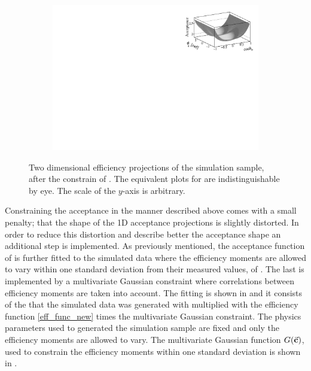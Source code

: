 \begin{figure}[t]
\begin{subfigure}{0.5\textwidth}
    \includegraphics[width=\textwidth]{Figures/Chapter4/canv_cosThL_phi_Sim08_3fb_hel_negKaons_all.pdf}
    \caption{}
    \label{eff2D_lp}
  \end{subfigure}
\caption{Two dimensional efficiency projections of the \BsJpsiKst simulation sample, after the constrain of .
         The equivalent plots for \BsbarJpsiKst are indistinguishable by eye. The scale of the $y$-axis is arbitrary.}
    \label{eff2D}
\end{figure}

Constraining the acceptance in the manner described above comes with a small penalty; that the shape of the 1D acceptance
projections is slightly distorted. In order to reduce this distortion and describe better the acceptance shape an additional step is implemented.
As previously mentioned, the acceptance function of  is further fitted to the simulated data
where the efficiency moments are allowed to vary within one standard deviation from their measured values, of .
The last is implemented by a multivariate Gaussian constraint where correlations between efficiency moments are taken into account.
The fitting \pdf is shown in  and it consists of the \pdf that the simulated
data was generated with multiplied with the efficiency function \eqref{eff_func_new} times the multivariate Gaussian constraint.
The physics parameters used to generated the simulation sample are fixed and only the efficiency moments are allowed to vary.
The multivariate Gaussian function $G(\vec{\bf{c}})$, used to constrain the efficiency moments within one standard deviation
is shown in .

